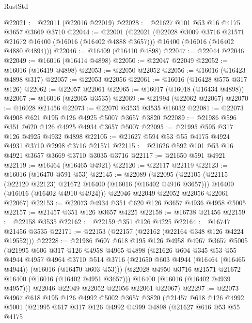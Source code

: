 \begin{lexlean}{RustStd}
\begin{coremodule}
@22021 := @22011 (@22016 @22019)
@22028 := @21627 @101 @53 @16 @4175 @3657 @3669 @3710
@22044 := @22001
    (@22021
      (@22028 @3009 @3716 @21571 @21672 @16400 (@16016 (@16402 @4888 @3657)))
      @16400
      (@16016 (@16402 @4880 @4894)))
@22046 := @16409 (@16410 @4898)
@22047 := @22044 @22046
@22049 := @16016 (@16414 @4898)
@22050 := @22047 @22049
@22052 := @16016 (@16419 @4898)
@22053 := @22050 @22052
@22056 := @16016 (@16423 @4898 @317)
@22057 := @22053 @22056
@22061 := @16016 (@16428 @575 @317 @126)
@22062 := @22057 @22061
@22065 := @16017 (@16018 (@16434 @4898))
@22067 := @16016 (@22065 @3535)
@22069 := @21994 (@22062 @22067)
@22070 := @16028 @21456
@22073 := @22070 @3535 @3535 @16032
@22081 := @22073 @4908 @621 @195 @126 @4925 @5007 @3657 @3820
@22089 := @21986 @596 @351 @620 @126 @4925 @4934 @3657 @5007
@22095 := @21995 @595 @317 @126 @4925 @4932 @4898
@22105 := @21627 @594 @53 @55 @4175 @4924 @4931 @3710 @2998 @3716 @21571
@22115 := @21626 @592 @101 @53 @16 @4921 @3657 @3669 @3710 @3035 @3716
@22117 := @21650 @591 @4921
@22119 := @16464 (@16465 @4921)
@22120 := @22117 @22119
@22123 := @16016 (@16470 @591 @53)
@22145 := @22089
    (@22095
      (@22105
        (@22115 (@22120 @22123) @21672 @16400 (@16016 (@16402 @4916 @3657)))
        @16400
        (@16016 (@16402 @4910 @4924)))
      @22046
      @22049
      @22052
      @22056
      @22061
      @22067)
@22153 := @22073 @4934 @351 @620 @126 @3657 @4936 @4958 @5005
@22157 := @21457 @351 @126 @3657 @4225
@22158 := @16738 @21456
@22159 := @22158 @3535
@22162 := @22159 @351 @126 @4225
@22164 := @16747 @21456 @3535
@22171 := @22153 (@22157 (@22162 (@22164 @348 @126 @4224 @19552)))
@22228 := @21986
    @607
    @618
    @195
    @126
    @4958
    @4967
    @3657
    @5005
    (@21995
      @606
      @317
      @126
      @4958
      @4965
      @4898
      (@21626
        @604
        @345
        @53
        @55
        @4944
        @4957
        @4964
        @3710
        @514
        @3716
        (@21650 @603 @4944 (@16464 (@16465 @4944)) (@16016 (@16470 @603 @53)))
        (@22028 @4950 @3716 @21571 @21672 @16400 (@16016 (@16402 @4951 @3657)))
        @16400
        (@16016 (@16402 @4939 @4957)))
      @22046
      @22049
      @22052
      @22056
      @22061
      @22067)
@22297 := @22073
    @4967
    @618
    @195
    @126
    @4992
    @5002
    @3657
    @3820
    (@21457
      @618
      @126
      @4992
      @5001
      (@21995
        @617
        @317
        @126
        @4992
        @4999
        @4898
        (@21627
          @616
          @53
          @55
          @4175

\end{coremodule}
\end{lexlean}
